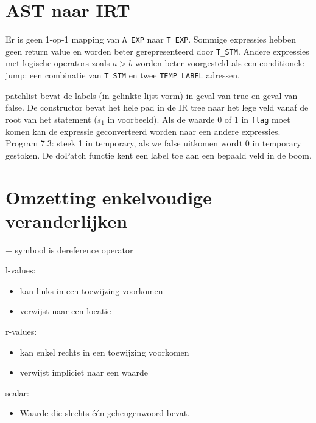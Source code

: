 \section{AST naar IRT}
Er is geen 1-op-1 mapping van \texttt{A\_EXP} naar \texttt{T\_EXP}. Sommige expressies hebben geen return value en worden beter gerepresenteerd door \texttt{T\_STM}. Andere expressies met logische operators zoals $a > b$ worden beter voorgesteld als een conditionele jump: een combinatie van \texttt{T\_STM} en twee \texttt{TEMP\_LABEL} adressen.


patchlist bevat de labels (in gelinkte lijst vorm) in geval van true en geval van false. De constructor bevat het hele pad in de IR tree naar het lege veld vanaf de root van het statement ($s_1$ in voorbeeld). Als de waarde 0 of 1 in \texttt{flag} moet komen kan de expressie geconverteerd worden naar een andere expressies. Program 7.3: steek 1 in temporary, als we false uitkomen wordt 0 in temporary gestoken. De doPatch functie kent een label toe aan een bepaald veld in de boom.

\section{Omzetting enkelvoudige veranderlijken}

$+$ symbool is dereference operator


l-values:
\begin{itemize}
	\item kan links in een toewijzing voorkomen
	\item verwijst naar een locatie
\end{itemize}

r-values:
\begin{itemize}
	\item kan enkel rechts in een toewijzing voorkomen
	\item verwijst impliciet naar een waarde
\end{itemize}

scalar:
\begin{itemize}
	\item Waarde die slechts één geheugenwoord bevat.
\end{itemize}



